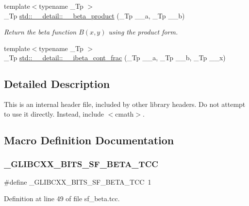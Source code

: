 \begin{DoxyCompactItemize}
{\footnotesize template$<$typename \+\_\+\+Tp $>$ }\\\+\_\+\+Tp \hyperlink{namespacestd_1_1____detail_a9baa688a27befab7fa48ccfb4a87a9ca}{std\+::\+\_\+\+\_\+detail\+::\+\_\+\+\_\+beta\+\_\+product} (\+\_\+\+Tp \+\_\+\+\_\+a, \+\_\+\+Tp \+\_\+\+\_\+b)
\begin{DoxyCompactList}\small\item\em Return the beta function $B(x,y)$ using the product form. \end{DoxyCompactList}\item 
{\footnotesize template$<$typename \+\_\+\+Tp $>$ }\\\+\_\+\+Tp \hyperlink{namespacestd_1_1____detail_a96a5a5205553de07f98b89b2e1f18000}{std\+::\+\_\+\+\_\+detail\+::\+\_\+\+\_\+ibeta\+\_\+cont\+\_\+frac} (\+\_\+\+Tp \+\_\+\+\_\+a, \+\_\+\+Tp \+\_\+\+\_\+b, \+\_\+\+Tp \+\_\+\+\_\+x)
\end{DoxyCompactItemize}


\subsection{Detailed Description}
This is an internal header file, included by other library headers. Do not attempt to use it directly. Instead, include $<$cmath$>$. 

\subsection{Macro Definition Documentation}
\mbox{\label{sf__beta_8tcc_a41fb0de3283ace5ea2b676d932ff3d32}} 
\subsubsection{\texorpdfstring{\+\_\+\+G\+L\+I\+B\+C\+X\+X\+\_\+\+B\+I\+T\+S\+\_\+\+S\+F\+\_\+\+B\+E\+T\+A\+\_\+\+T\+CC}{\_GLIBCXX\_BITS\_SF\_BETA\_TCC}}
{\footnotesize\ttfamily \#define \+\_\+\+G\+L\+I\+B\+C\+X\+X\+\_\+\+B\+I\+T\+S\+\_\+\+S\+F\+\_\+\+B\+E\+T\+A\+\_\+\+T\+CC~1}



Definition at line 49 of file sf\+\_\+beta.\+tcc.

